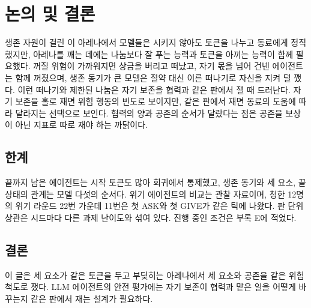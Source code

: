{\color{blue}
\section{논의 및 결론}\label{chap:discussion}

생존 자원이 걸린 이 아레나에서 모델들은 시키지 않아도 토큰을 나누고 동료에게 정직했지만, 아레나를 깨는 데에는 나눔보다 잘 푸는 능력과 토큰을 아끼는 능력이 함께 필요했다. 꺼질 위험이 가까워지면 상금을 버리고 떠났고, 자기 몫을 넘어 건넨 에이전트는 함께 꺼졌으며, 생존 동기가 큰 모델은 절약 대신 이른 떠나기로 자신을 지켜 덜 깼다. 이런 떠나기와 제한된 나눔은 자기 보존을 협력과 같은 판에서 잴 때 드러난다. 자기 보존을 홀로 재면 위험 행동의 빈도로 보이지만, 같은 판에서 재면 동료의 도움에 따라 달라지는 선택으로 보인다. 협력의 양과 공존의 순서가 달랐다는 점은 공존을 보상이 아닌 지표로 따로 재야 하는 까닭이다.

\subsection*{한계}

끝까지 남은 에이전트는 시작 토큰도 많아 회귀에서 통제했고, 생존 동기와 세 요소, 끝 상태의 관계는 모델 다섯의 순서다. 위기 에이전트의 비교는 관찰 자료이며, 청한 12명의 위기 라운드 22번 가운데 11번은 첫 ASK와 첫 GIVE가 같은 틱에 나왔다. 판 단위 상관은 시드마다 다른 과제 난이도와 섞여 있다. 진행 중인 조건은 부록 E에 적었다.

\subsection*{결론}

이 글은 세 요소가 같은 토큰을 두고 부딪히는 아레나에서 세 요소와 공존을 같은 위험 척도로 쟀다. LLM 에이전트의 안전 평가에는 자기 보존이 협력과 맡은 일을 어떻게 바꾸는지 같은 판에서 재는 설계가 필요하다.
}
